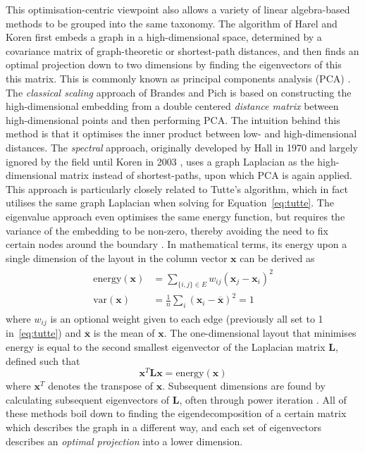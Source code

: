 This optimisation-centric viewpoint also allows a variety of linear algebra-based methods to be grouped into the same taxonomy.
The algorithm of Harel and Koren \cite{Harel2004} first embeds a graph in a high-dimensional space, determined by a covariance matrix of graph-theoretic or shortest-path distances, and then finds an optimal projection down to two dimensions by finding the eigenvectors of this this matrix. This is commonly known as principal components analysis (PCA) \cite{Pearson1901}.
The \emph{classical scaling} approach of Brandes and Pich \cite{Brandes2007Eigensolver} is based on constructing the high-dimensional embedding from a double centered \emph{distance matrix} between high-dimensional points and then performing PCA. The intuition behind this method is that it optimises the inner product between low- and high-dimensional distances.
The \emph{spectral} approach, originally developed by Hall in 1970 \cite{Hall1970} and largely ignored by the field until Koren in 2003 \cite{Koren2003}, uses a graph Laplacian as the high-dimensional matrix instead of shortest-paths, upon which PCA is again applied. This approach is particularly closely related to Tutte's algorithm, which in fact utilises the same graph Laplacian when solving for Equation~\eqref{eq:tutte}.
The eigenvalue approach even optimises the same energy function, but requires the variance of the embedding to be non-zero, thereby avoiding the need to fix certain nodes around the boundary \cite{Koren2003}.
In mathematical terms, its energy upon a single dimension of the layout in the column vector $\mathbf{x}$ can be derived as
\begin{align}
\begin{split}
  \mathrm{energy}(\mathbf{x}) &= \sum_{\{i,j\}\in E}w_{ij}(\mathbf{x}_j-\mathbf{x}_i)^2\\
  \mathrm{var}(\mathbf{x}) &= \frac{1}{n}\sum_i(\mathbf{x}_i-\overline{\mathbf{x}})^2 = 1
\end{split}
\label{eq:spectral}
\end{align}
where $w_{ij}$ is an optional weight given to each edge (previously all set to 1 in~\eqref{eq:tutte}) and $\overline{\mathbf{x}}$ is the mean of $\mathbf{x}$. The one-dimensional layout that minimises energy is equal to the second smallest eigenvector of the Laplacian matrix $\mathbf{L}$, defined such that
\begin{equation}
  \mathbf{x}^T\mathbf{Lx} = \mathrm{energy}(\mathbf{x})
  \label{eq:spectral_laplacian}
\end{equation}
where $\mathbf{x}^T$ denotes the transpose of $\mathbf{x}$. Subsequent dimensions are found by calculating subsequent eigenvectors of $\mathbf{L}$, often through power iteration \cite{Koren2003}.
All of these methods boil down to finding the eigendecomposition of a certain matrix which describes the graph in a different way, and each set of eigenvectors describes an \emph{optimal projection} into a lower dimension.

